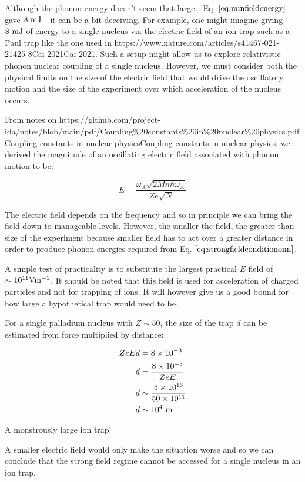 \documentclass[
]{article}
\let\oldhref\href
\renewcommand{\href}[2]{\ifx#1\urlprefix\oldhref{#1}{#2}\else\uline{\oldhref{#1}{#2}}\fi}
\renewcommand{\[}{\begin{equation}}
\renewcommand{\]}{\end{equation}}
\begin{document}
Although the phonon energy doesn't seem that large - Eq.
\(\ref{eq:minfieldenergy}\) gave \(8 \ \rm mJ\) - it can be a bit
deceiving. For example, one might imagine giving \(8 \ \rm mJ\) of
energy to a single nucleus via the electric field of an ion trap such as
a Paul trap like the one used in
\href{https://www.nature.com/articles/s41467-021-21425-8}{Cai 2021}.
Such a setup might allow us to explore relativistic phonon nuclear
coupling of a single nucleus. However, we must consider both the
physical limits on the size of the electric field that would drive the
oscillatory motion and the size of the experiment over which
acceleration of the nucleus occurs.

From notes on
\href{https://github.com/project-ida/notes/blob/main/pdf/Coupling\%20constants\%20in\%20nuclear\%20physics.pdf}{Coupling
constants in nuclear physics}, we derived the magnitude of an
oscillating electric field associated with phonon motion to be:

\[
E = \frac{\omega_A \sqrt{2M n\hbar \omega_A}}{Ze \sqrt{N}} \label{eq:E}
\]

The electric field depends on the frequency and so in principle we can
bring the field down to manageable levels. However, the smaller the
field, the greater than size of the experiment because smaller field has
to act over a greater distance in order to produce phonon energies
required from Eq. \(\ref{eq:strongfieldconditiononn}\).

A simple test of practicality is to substitute the largest practical
\(E\) field of \(\sim 10^{11} \rm Vm^{-1}\). It should be noted that
this field is used for acceleration of charged particles and not for
trapping of ions. It will however give us a good bound for how large a
hypothetical trap would need to be.

For a single palladium nucleus with \(Z \sim 50\), the size of the trap
\(d\) can be estimated from force multiplied by distance:

\[
\begin{aligned}
ZeEd &= 8\times 10^{-3} \\
d  &= \frac{8\times 10^{-3}}{ZeE} \\
d  &\sim \frac{5\times 10^{16}}{50 \times 10^{11}} \\
d &\sim 10^4 \ \rm m
\end{aligned}
\]

A monstrously large ion trap!

A smaller electric field would only make the situation worse and so we
can conclude that the strong field regime cannot be accessed for a
single nucleus in an ion trap.
\end{document}
